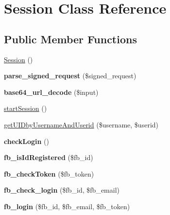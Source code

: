 \hypertarget{class_session}{\section{Session Class Reference}
\label{class_session}
}
\subsection*{Public Member Functions}
\begin{DoxyCompactItemize}
\item 
\hyperlink{class_session_a9f2567297f1c0fd0532fa8763308134a}{Session} ()
\item 
\hypertarget{class_session_ab6b546dddb136aab87dfac41264ffc31}{{\bfseries parse\-\_\-signed\-\_\-request} (\$signed\-\_\-request)}\label{class_session_ab6b546dddb136aab87dfac41264ffc31}

\item 
\hypertarget{class_session_a3c363e3c0e180786fec40cd418be2827}{{\bfseries base64\-\_\-url\-\_\-decode} (\$input)}\label{class_session_a3c363e3c0e180786fec40cd418be2827}

\item 
\hyperlink{class_session_a1e201c0957bc704471a78cd492174871}{start\-Session} ()
\item 
\hyperlink{class_session_af29ab581f7144f68fc0982e66cde6608}{get\-U\-I\-Dby\-Username\-And\-Userid} (\$username, \$userid)
\item 
\hypertarget{class_session_ab8e90adf3e4b15eea283c4ea450a4288}{{\bfseries check\-Login} ()}\label{class_session_ab8e90adf3e4b15eea283c4ea450a4288}

\item 
\hypertarget{class_session_a9bf8045a373664900252ed00d4f2ee3e}{{\bfseries fb\-\_\-is\-Id\-Registered} (\$fb\-\_\-id)}\label{class_session_a9bf8045a373664900252ed00d4f2ee3e}

\item 
\hypertarget{class_session_ad2c1b6e7059646a0175c4d44a58d9a24}{{\bfseries fb\-\_\-check\-Token} (\$fb\-\_\-token)}\label{class_session_ad2c1b6e7059646a0175c4d44a58d9a24}

\item 
\hypertarget{class_session_aebb3dd053976304c2e37ed1a6269215d}{{\bfseries fb\-\_\-check\-\_\-login} (\$fb\-\_\-id, \$fb\-\_\-email)}\label{class_session_aebb3dd053976304c2e37ed1a6269215d}

\item 
\hypertarget{class_session_a42df37109421ddfba6fb3b6a5f750b74}{{\bfseries fb\-\_\-login} (\$fb\-\_\-id, \$fb\-\_\-email, \$fb\-\_\-token)}\label{class_session_a42df37109421ddfba6fb3b6a5f750b74}


\end{DoxyCompactItemize}
